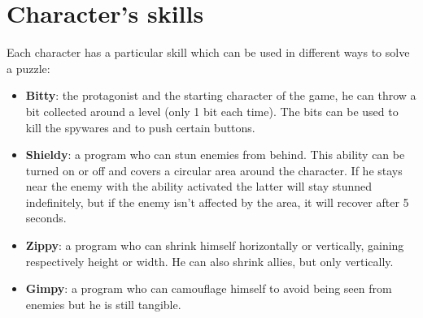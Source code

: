 \documentclass[12pt, a4paper]{report}
\begin{document}
\section*{Character’s skills}
Each character has a particular skill which can be used in different ways to solve a puzzle:
\begin{itemize}
	\item \textbf{Bitty}: the protagonist and the starting character of the game, he can throw a bit collected around a level (only 1 bit each time). The bits 			can be used to kill the spywares and to push certain buttons.
	\item \textbf{Shieldy}: a program who can stun enemies from behind. This ability can be turned on or off and covers a circular area around the 				character. If he stays near the enemy with the ability activated the latter will stay stunned indefinitely, but if the enemy isn't affected by the area, it will
	recover after 5 seconds.
	\item \textbf{Zippy}:  a program who can shrink himself horizontally or vertically, gaining respectively height or width. He can also shrink allies, but only 		vertically.
	\item \textbf{Gimpy}: a program who can camouflage himself to avoid being seen from enemies but he is still tangible.
\end{itemize}
\end{document}
